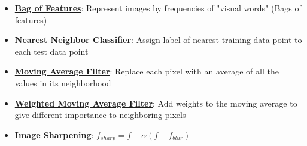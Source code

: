 \documentclass{article}%
\begin{document}
\begin{itemize}[leftmargin=*]%
\item \href{https://purdue.brightspace.com/d2l/common/assets/pdfjs-d2l-dist/1.0.14-legacy/web/viewer.html?file=%2Fcontent%2Fenforced%2F1095467-wl.202510.CS.24300.001%2F07L2-Vision.pdf%3Fou%3D1095467&lang=en-us&container=d2l-fileviewer-rendered-pdf&fullscreen=d2l-fileviewer-rendered-pdf-dialog&height=667#page=16}{\textbf{Bag of Features}}: Represent images by frequencies of "visual words" (Bags of features)%
\item \href{https://purdue.brightspace.com/d2l/common/assets/pdfjs-d2l-dist/1.0.14-legacy/web/viewer.html?file=%2Fcontent%2Fenforced%2F1095467-wl.202510.CS.24300.001%2F07L2-Vision.pdf%3Fou%3D1095467&lang=en-us&container=d2l-fileviewer-rendered-pdf&fullscreen=d2l-fileviewer-rendered-pdf-dialog&height=667#page=30}{\textbf{Nearest Neighbor Classifier}}: Assign label of nearest training data point to each test data point%
\item \href{https://purdue.brightspace.com/d2l/common/assets/pdfjs-d2l-dist/1.0.14-legacy/web/viewer.html?file=%2Fcontent%2Fenforced%2F1095467-wl.202510.CS.24300.001%2F07L2-Vision.pdf%3Fou%3D1095467&lang=en-us&container=d2l-fileviewer-rendered-pdf&fullscreen=d2l-fileviewer-rendered-pdf-dialog&height=667#page=38}{\textbf{Moving Average Filter}}: Replace each pixel with an average of all the values in its neighborhood%
\item \href{https://purdue.brightspace.com/d2l/common/assets/pdfjs-d2l-dist/1.0.14-legacy/web/viewer.html?file=%2Fcontent%2Fenforced%2F1095467-wl.202510.CS.24300.001%2F07L2-Vision.pdf%3Fou%3D1095467&lang=en-us&container=d2l-fileviewer-rendered-pdf&fullscreen=d2l-fileviewer-rendered-pdf-dialog&height=667#page=40}{\textbf{Weighted Moving Average Filter}}: Add weights to the moving average to give different importance to neighboring pixels%
\item \href{https://purdue.brightspace.com/d2l/common/assets/pdfjs-d2l-dist/1.0.14-legacy/web/viewer.html?file=%2Fcontent%2Fenforced%2F1095467-wl.202510.CS.24300.001%2F07L2-Vision.pdf%3Fou%3D1095467&lang=en-us&container=d2l-fileviewer-rendered-pdf&fullscreen=d2l-fileviewer-rendered-pdf-dialog&height=667#page=55}{\textbf{Image Sharpening}}: $f_{sharp} = f + \alpha(f - f_{blur})$%
\end{itemize}%
\end{document}
